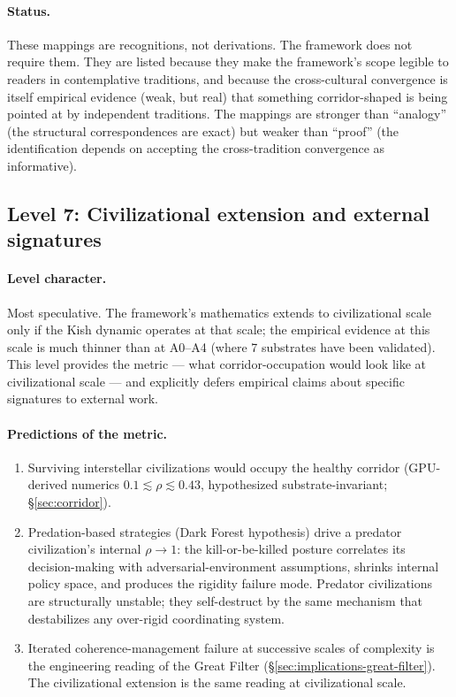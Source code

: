 \documentclass[11pt,a4paper]{article}
\begin{document}
\paragraph{Status.} These mappings are recognitions, not derivations. The framework does not require them. They are listed because they make the framework's scope legible to readers in contemplative traditions, and because the cross-cultural convergence is itself empirical evidence (weak, but real) that something corridor-shaped is being pointed at by independent traditions. The mappings are stronger than ``analogy'' (the structural correspondences are exact) but weaker than ``proof'' (the identification depends on accepting the cross-tradition convergence as informative).

\subsection{Level 7: Civilizational extension and external signatures}
\label{sec:conjecture-civilizational}

\paragraph{Level character.} Most speculative. The framework's mathematics extends to civilizational scale only if the Kish dynamic operates at that scale; the empirical evidence at this scale is much thinner than at A0--A4 (where 7 substrates have been validated). This level provides the metric --- what corridor-occupation would look like at civilizational scale --- and explicitly defers empirical claims about specific signatures to external work.

\paragraph{Predictions of the metric.}
\begin{enumerate}[leftmargin=*,itemsep=2pt,start=10]
  \item Surviving interstellar civilizations would occupy the healthy corridor (GPU-derived numerics $0.1 \lesssim \rho \lesssim 0.43$, hypothesized substrate-invariant; \S\ref{sec:corridor}).
  \item Predation-based strategies (Dark Forest hypothesis) drive a predator civilization's internal $\rho \to 1$: the kill-or-be-killed posture correlates its decision-making with adversarial-environment assumptions, shrinks internal policy space, and produces the rigidity failure mode. Predator civilizations are structurally unstable; they self-destruct by the same mechanism that destabilizes any over-rigid coordinating system.
  \item Iterated coherence-management failure at successive scales of complexity is the engineering reading of the Great Filter (\S\ref{sec:implications-great-filter}). The civilizational extension is the same reading at civilizational scale.
\end{enumerate}
\end{document}
